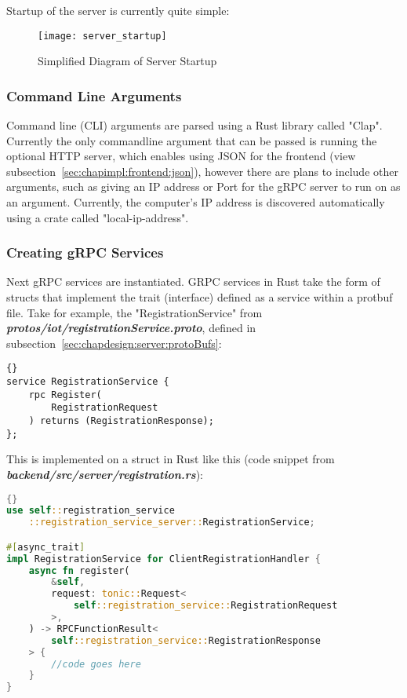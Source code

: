 Startup of the server is currently quite simple:

\begin{figure}[h]
\caption{Simplified Diagram of Server Startup}
\texttt{[image: server\_startup]}
\end{figure}

\subsubsection{Command Line Arguments}
Command line (CLI) arguments are parsed using a Rust library called "Clap". Currently the only commandline argument that can be passed is running the optional HTTP server, which enables using JSON for the frontend (view subsection~\ref{sec:chapimpl:frontend:json}), however there are plans to include other arguments, such as giving an IP address or Port for the gRPC server to run on as an argument. Currently, the computer's IP address is discovered automatically using a crate called "local-ip-address". 

\subsubsection{Creating gRPC Services}
Next gRPC services are instantiated. GRPC services in Rust take the form of structs that implement the trait (interface) defined as a service within a protbuf file. Take for example, the "RegistrationService" from \textbf{\textit{protos/iot/registrationService.proto}}, defined in subsection~\ref{sec:chapdesign:server:protoBufs}:
\begin{lstlisting}[language=protobuf3, style=boxed, showstringspaces=false]{}
service RegistrationService {
    rpc Register(
        RegistrationRequest
    ) returns (RegistrationResponse);
};
\end{lstlisting}

This is implemented on a struct in Rust like this (code snippet from \textit{\textbf{backend/src/server/registration.rs}}):
\begin{lstlisting}[language=Rust, style=boxed, showstringspaces=false]{}
use self::registration_service
    ::registration_service_server::RegistrationService;

#[async_trait]
impl RegistrationService for ClientRegistrationHandler {
    async fn register(
        &self,
        request: tonic::Request<
            self::registration_service::RegistrationRequest
        >,
    ) -> RPCFunctionResult<
        self::registration_service::RegistrationResponse
    > {
        //code goes here
    }
}
\end{lstlisting}

